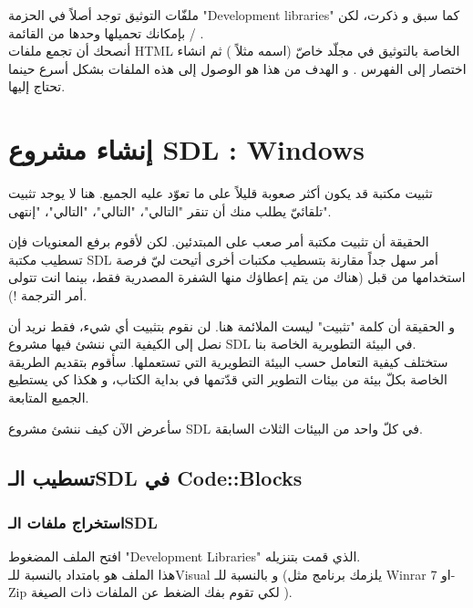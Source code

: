 ملفّات التوثيق توجد أصلاً في الحزمة
"\textenglish{Development libraries}"
كما سبق و ذكرت، لكن بإمكانك تحميلها وحدها من القائمة
 / .\\
أنصحك أن تجمع ملفات
\textenglish{HTML}
الخاصة بالتوثيق في مجلّد خاصّ (اسمه مثلاً
)
ثم انشاء اختصار إلى الفهرس
.
و الهدف من هذا هو الوصول إلى هذه الملفات بشكل أسرع حينما تحتاج إليها.

\section{إنشاء مشروع \textenglish{SDL} : \textenglish{Windows}}

تثبيت مكتبة قد يكون أكثر صعوبة قليلاً على ما تعوّد عليه الجميع. هنا لا يوجد تثبيت تلقائيّ يطلب منك أن تنقر "التالي"، "التالي"، "التالي"، "إنتهى".

الحقيقة أن تثبيت مكتبة أمر صعب على المبتدئين. لكن لأقوم برفع المعنويات فإن تسطيب مكتبة 
\textenglish{SDL}
أمر سهل جداً مقارنة بتسطيب مكتبات أخرى أتيحت ليّ فرصة استخدامها من قبل (هناك من يتم إعطاؤك منها الشفرة المصدرية فقط، بينما انت تتولى أمر الترجمة !).

و الحقيقة أن كلمة "تثبيت" ليست الملائمة هنا. لن نقوم بتثبيت أي شيء، فقط نريد أن نصل إلى الكيفية التي ننشئ فيها مشروع 
\textenglish{SDL}
في البيئة التطويرية الخاصة بنا.\\
ستختلف كيفية التعامل حسب البيئة التطويرية التي تستعملها. سأقوم بتقديم الطريقة الخاصة بكلّ بيئة من بيئات التطوير التي قدّتمها في بداية الكتاب، و هكذا كي يستطيع الجميع المتابعة.

سأعرض الآن كيف ننشئ مشروع
\textenglish{SDL}
في كلّ واحد من البيئات الثلاث السابقة.

\subsection{تسطيب الـ\textenglish{SDL} في \textenglish{Code::Blocks}}

\subsubsection{استخراج ملفات الـ\textenglish{SDL}}

افتح الملف المضغوط
"\textenglish{Development Libraries}"
الذي قمت بتنزيله.\\
هذا الملف هو بامتداد
بالنسبة للـ\textenglish{Visual}
و 
بالنسبة للـ
(يلزمك برنامج مثل 
\textenglish{Winrar}
او
\textenglish{7-Zip}
لكي تقوم بفك الضغط عن الملفات ذات الصيغة 
).

